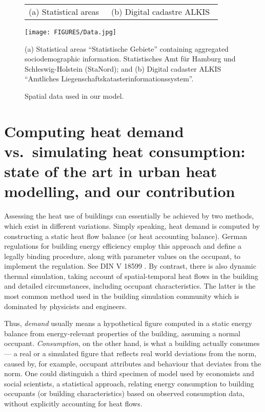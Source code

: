 \documentclass[11pt]{IJM-article}
\begin{document}
\begin{figure}[htb]
    \caption{Spatial data used in our model.}\label{fig:2}
    \centering
    \vspace{2ex}
    \begin{tabular}{p{}p{}}
        (a) Statistical areas~\label{fig:2a} & 
        (b) Digital cadastre ALKIS~\label{fig:2b}\\
    \end{tabular}
    \texttt{[image: FIGURES/Data.jpg]}
    \begin{flushleft}
    \begin{footnotesize}
(a) Statistical areas ``Statistische Gebiete'' containing aggregated
sociodemographic information. Statistisches Amt für Hamburg und
Schleswig-Holstein (StaNord); and (b) Digital cadaster ALKIS ``Amtliches
Liegenschaftskatasterinformationssystem''. 
    \end{footnotesize}
    \end{flushleft}
\end{figure}

\section{Computing heat demand vs.\ simulating heat consumption: state of the
art in urban heat modelling, and our contribution }
\label{sec:4}

Assessing the heat use of buildings can essentially be achieved by two methods,
which exist in different variations. Simply speaking, heat demand is computed
by constructing a static heat flow balance (or heat accounting balance). German
regulations for building energy efficiency employ this approach and define a
legally binding procedure, along with parameter values on the occupant, to
implement the regulation. See DIN V 18599  .  By contrast,
there is also dynamic thermal simulation, taking account of spatial-temporal
heat flows in the building and detailed circumstances, including occupant
characteristics. The latter is the most common method used in the building
simulation community  which is dominated by physicists and
engineers.

Thus, \textit{demand} usually means a hypothetical figure computed in a static
energy balance from energy-relevant properties of the building, assuming a
normal occupant. \textit{Consumption}, on the other hand, is what a building
actually consumes --- a real or a simulated figure that reflects real world
deviations from the norm, caused by, for example, occupant attributes and
behaviour that deviates from the norm. One could distinguish a third specimen
of model used by economists and social scientists, a statistical approach,
relating energy consumption to building occupants (or building characteristics)
based on observed consumption data, without explicitly accounting for heat
flows.
\end{document}
